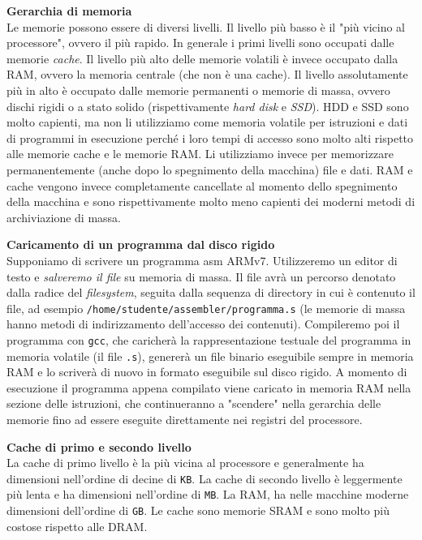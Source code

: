\begin{defn}
    \textbf{Gerarchia di memoria} \\
    Le memorie possono essere di diversi livelli. Il livello più basso è il "più
    vicino al processore", ovvero il più rapido. In generale i primi livelli
    sono occupati dalle memorie \textit{cache}. Il livello più alto delle
    memorie volatili è invece occupato dalla RAM, ovvero la memoria centrale
    (che non è una cache). Il livello assolutamente più in alto è occupato dalle
    memorie permanenti o memorie di massa, ovvero dischi rigidi o a stato solido
    (rispettivamente \textit{hard disk} e \textit{SSD}). HDD e SSD sono molto
    capienti, ma non li utilizziamo come memoria volatile per istruzioni e dati
    di programmi in esecuzione perché i loro tempi di accesso sono molto alti
    rispetto alle memorie cache e le memorie RAM. Li utilizziamo invece per
    memorizzare permanentemente (anche dopo lo spegnimento della macchina) file
    e dati. RAM e cache vengono invece completamente cancellate al momento dello
    spegnimento della macchina e sono rispettivamente molto meno capienti dei
    moderni metodi di archiviazione di massa.
\end{defn}

\begin{exmp}
    \textbf{Caricamento di un programma dal disco rigido} \\
    Supponiamo di scrivere un programma asm ARMv7. Utilizzeremo un editor di
    testo e \textit{salveremo il file} su memoria di massa. Il file avrà un
    percorso denotato dalla radice del \textit{filesystem}, seguita dalla
    sequenza di directory in cui è contenuto il file, ad esempio
    \texttt{/home/studente/assembler/programma.s} (le memorie di massa hanno
    metodi di indirizzamento dell'accesso dei contenuti). Compileremo poi il
    programma con \texttt{gcc}, che caricherà la rappresentazione testuale del
    programma in memoria volatile (il file \texttt{.s}), genererà un file
    binario eseguibile sempre in memoria RAM e lo scriverà di nuovo in formato
    eseguibile sul disco rigido. A momento di esecuzione il programma appena
    compilato viene caricato in memoria RAM nella sezione delle istruzioni, che
    continueranno a "scendere" nella gerarchia delle memorie fino ad essere
    eseguite direttamente nei registri del processore.
\end{exmp}

\begin{defn}
    \textbf{Cache di primo e secondo livello} \\
    La cache di primo livello è la più vicina al processore e generalmente ha
    dimensioni nell'ordine di decine di \texttt{KB}. La cache di secondo livello
    è leggermente più lenta e ha dimensioni nell'ordine di \texttt{MB}. La RAM,
    ha nelle macchine moderne dimensioni dell'ordine di \texttt{GB}. Le cache
    sono memorie SRAM e sono molto più costose rispetto alle DRAM.
\end{defn}

